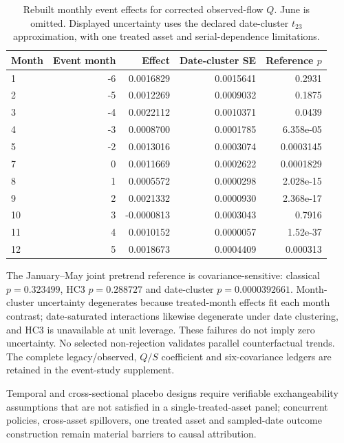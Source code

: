 \documentclass[12pt]{article}
\theoremstyle{definition}
\theoremstyle{remark}
\begin{document}
\begin{table}[htbp]
\centering\footnotesize
\caption{Rebuilt monthly event effects for corrected observed-flow $Q$. June is omitted. Displayed uncertainty uses the declared date-cluster $t_{23}$ approximation, with one treated asset and serial-dependence limitations.}
\label{tab:dynamic_event_study}
\begin{tabular}{lrrrr}\toprule
Month & Event month & Effect & Date-cluster SE & Reference $p$ \\\midrule
1 & -6 & 0.0016829 & 0.0015641 & 0.2931 \\
2 & -5 & 0.0012269 & 0.0009032 & 0.1875 \\
3 & -4 & 0.0022112 & 0.0010371 & 0.0439 \\
4 & -3 & 0.0008700 & 0.0001785 & 6.358e-05 \\
5 & -2 & 0.0013016 & 0.0003074 & 0.0003145 \\
7 & 0 & 0.0011669 & 0.0002622 & 0.0001829 \\
8 & 1 & 0.0005572 & 0.0000298 & 2.028e-15 \\
9 & 2 & 0.0021332 & 0.0000930 & 2.368e-17 \\
10 & 3 & -0.0000813 & 0.0003043 & 0.7916 \\
11 & 4 & 0.0010152 & 0.0000057 & 1.52e-37 \\
12 & 5 & 0.0018673 & 0.0004409 & 0.000313 \\
\bottomrule\end{tabular}
\end{table}

The January--May joint pretrend reference is covariance-sensitive: classical $p=0.323499$, HC3 $p=0.288727$ and date-cluster $p=0.0000392661$. Month-cluster uncertainty degenerates because treated-month effects fit each month contrast; date-saturated interactions likewise degenerate under date clustering, and HC3 is unavailable at unit leverage. These failures do not imply zero uncertainty. No selected non-rejection validates parallel counterfactual trends. The complete legacy/observed, $Q/S$ coefficient and six-covariance ledgers are retained in the event-study supplement.

Temporal and cross-sectional placebo designs require verifiable exchangeability assumptions that are not satisfied in a single-treated-asset panel; concurrent policies, cross-asset spillovers, one treated asset and sampled-date outcome construction remain material barriers to causal attribution.
\end{document}
